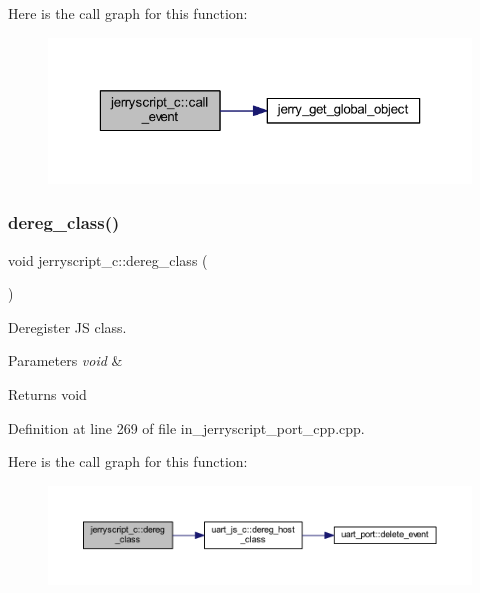 Here is the call graph for this function\+:
\nopagebreak
\begin{figure}[H]
\begin{center}
\leavevmode
\includegraphics[width=323pt]{group___port_ga8337a400e02afeccd827f34fed4a939b_cgraph}
\end{center}
\end{figure}
\mbox{\label{group___port_ga70b677ec5e646c036898c1046604b371}} 
\subsubsection{dereg\_class()}
{\footnotesize\ttfamily void jerryscript\+\_\+c\+::dereg\+\_\+class (\begin{DoxyParamCaption}\item[{void}]{ }\end{DoxyParamCaption})}



Deregister JS class. 


\begin{DoxyParams}{Parameters}
{\em void} & \\
\hline
\end{DoxyParams}
\begin{DoxyReturn}{Returns}
void 
\end{DoxyReturn}


Definition at line 269 of file in\+\_\+jerryscript\+\_\+port\+\_\+cpp.\+cpp.

Here is the call graph for this function\+:
\nopagebreak
\begin{figure}[H]
\begin{center}
\leavevmode
\includegraphics[width=350pt]{group___port_ga70b677ec5e646c036898c1046604b371_cgraph}
\end{center}
\end{figure}
\mbox{\label{group___port_ga4a55381220a67dcd44e95e39aaf20d6a}} 
